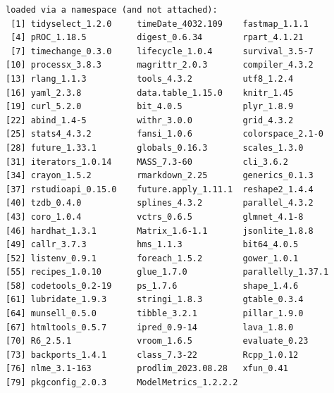\documentclass[
  letterpaper,
  DIV=11,
  numbers=noendperiod]{scrartcl}
\begin{document}
\begin{tcolorbox}
\begin{verbatim}
loaded via a namespace (and not attached):
 [1] tidyselect_1.2.0     timeDate_4032.109    fastmap_1.1.1       
 [4] pROC_1.18.5          digest_0.6.34        rpart_4.1.21        
 [7] timechange_0.3.0     lifecycle_1.0.4      survival_3.5-7      
[10] processx_3.8.3       magrittr_2.0.3       compiler_4.3.2      
[13] rlang_1.1.3          tools_4.3.2          utf8_1.2.4          
[16] yaml_2.3.8           data.table_1.15.0    knitr_1.45          
[19] curl_5.2.0           bit_4.0.5            plyr_1.8.9          
[22] abind_1.4-5          withr_3.0.0          grid_4.3.2          
[25] stats4_4.3.2         fansi_1.0.6          colorspace_2.1-0    
[28] future_1.33.1        globals_0.16.3       scales_1.3.0        
[31] iterators_1.0.14     MASS_7.3-60          cli_3.6.2           
[34] crayon_1.5.2         rmarkdown_2.25       generics_0.1.3      
[37] rstudioapi_0.15.0    future.apply_1.11.1  reshape2_1.4.4      
[40] tzdb_0.4.0           splines_4.3.2        parallel_4.3.2      
[43] coro_1.0.4           vctrs_0.6.5          glmnet_4.1-8        
[46] hardhat_1.3.1        Matrix_1.6-1.1       jsonlite_1.8.8      
[49] callr_3.7.3          hms_1.1.3            bit64_4.0.5         
[52] listenv_0.9.1        foreach_1.5.2        gower_1.0.1         
[55] recipes_1.0.10       glue_1.7.0           parallelly_1.37.1   
[58] codetools_0.2-19     ps_1.7.6             shape_1.4.6         
[61] lubridate_1.9.3      stringi_1.8.3        gtable_0.3.4        
[64] munsell_0.5.0        tibble_3.2.1         pillar_1.9.0        
[67] htmltools_0.5.7      ipred_0.9-14         lava_1.8.0          
[70] R6_2.5.1             vroom_1.6.5          evaluate_0.23       
[73] backports_1.4.1      class_7.3-22         Rcpp_1.0.12         
[76] nlme_3.1-163         prodlim_2023.08.28   xfun_0.41           
[79] pkgconfig_2.0.3      ModelMetrics_1.2.2.2
\end{verbatim}

\end{tcolorbox}
\end{document}
